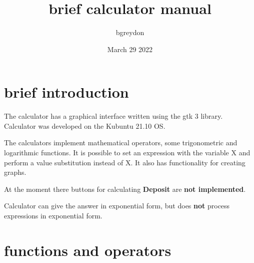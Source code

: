 \documentclass[12pt, a4paper]{article}
\title{brief calculator manual}
\author{bgreydon}
\date{March 29 2022}
\begin{document}
\maketitle

\pagebreak

\tableofcontents

\pagebreak

\section{brief introduction}



The calculator has a graphical interface written using the gtk 3 library.
Calculator was developed on the Kubuntu 21.10 OS.

The calculators implement mathematical operators, some trigonometric and logarithmic functions. It is possible to set an expression with the variable X and perform a value substitution instead of X. It also has functionality for creating graphs.

At the moment there buttons for calculating \textbf{Deposit} are \textbf{not implemented}.

Calculator can give the answer in exponential form, but does \textbf{not} process expressions in exponential form.

\pagebreak

\section{functions and operators}
\end{document}
